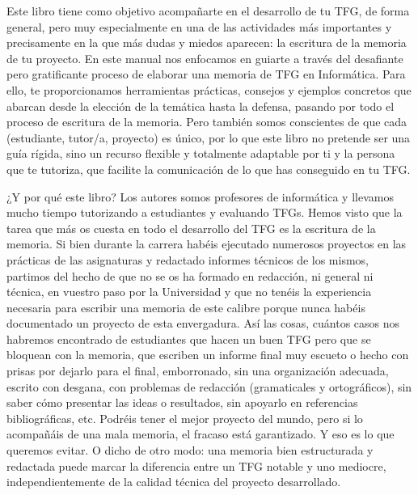 Este libro tiene como objetivo acompañarte en el desarrollo de tu TFG, de forma general, pero muy especialmente en una de las actividades más importantes y precisamente en la que más dudas y miedos aparecen: la escritura de la memoria de tu proyecto. En este manual nos enfocamos en guiarte a través del desafiante pero gratificante proceso de elaborar una memoria de TFG en Informática. Para ello, te proporcionamos herramientas prácticas, consejos y ejemplos concretos que abarcan desde la elección de la temática hasta la defensa, pasando por todo el proceso de escritura de la memoria. Pero también somos conscientes de que cada (estudiante, tutor/a, proyecto) es único, por lo que este libro no pretende ser una guía rígida, sino un recurso flexible y totalmente adaptable por ti y la persona que te tutoriza, que facilite la comunicación de lo que has conseguido en tu TFG.

¿Y por qué este libro? Los autores somos profesores de informática y llevamos mucho tiempo tutorizando a estudiantes y evaluando TFGs. Hemos visto que la tarea que más os cuesta en todo el desarrollo del TFG es la escritura de la memoria. Si bien durante la carrera habéis ejecutado numerosos proyectos en las prácticas de las asignaturas y redactado informes técnicos de los mismos, partimos del hecho de que no se os ha formado en redacción, ni general ni técnica, en vuestro paso por la Universidad y que no tenéis la experiencia necesaria para escribir una memoria de este calibre porque nunca habéis documentado un proyecto de esta envergadura. Así las cosas, cuántos casos nos habremos encontrado de estudiantes que hacen un buen TFG pero que se bloquean con la memoria, que escriben un informe final muy escueto o hecho con prisas por dejarlo para el final, emborronado, sin una organización adecuada, escrito con desgana, con problemas de redacción (gramaticales y ortográficos), sin saber cómo presentar las ideas o resultados, sin apoyarlo en referencias bibliográficas, etc. Podréis tener el mejor proyecto del mundo, pero si lo acompañáis de una mala memoria, el fracaso está garantizado. Y eso es lo que queremos evitar. O dicho de otro modo: una memoria bien estructurada y redactada puede marcar la diferencia entre un TFG notable y uno mediocre, independientemente de la calidad técnica del proyecto desarrollado.

